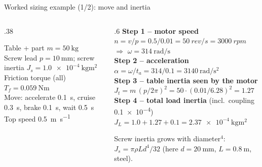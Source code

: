 \documentclass[aspectratio=169,10pt]{beamer}
\begin{document}
\begin{frame}{Worked sizing example (1/2): move and inertia}
\begin{columns}[T]
\begin{column}{.38\textwidth}
\begin{defbox}
\small
Table + part $m=\SI{50}{\kilo\gram}$\\
Screw lead $p=\SI{10}{\milli\metre}$; screw inertia $J_s=\SI{1.0e-4}{\kilo\gram\metre\squared}$\\
Friction torque (all) $T_f=\SI{0.059}{\newton\metre}$\\
Move: accelerate \SI{0.1}{\second}, cruise \SI{0.3}{\second}, brake \SI{0.1}{\second}, wait \SI{0.5}{\second}\\
Top speed \SI{0.5}{\metre\per\second}
\end{defbox}
\end{column}
\begin{column}{.6\textwidth}
\small
\textbf{Step 1 -- motor speed}\\
$n=v/p=0.5/0.01=\SI{50}{rev/s}=\SI{3000}{rpm}$ $\Rightarrow$ $\omega=\SI{314}{\radian\per\second}$\\[2mm]
\textbf{Step 2 -- acceleration}\\
$\alpha=\omega/t_a=314/0.1=\SI{3140}{\radian\per\second\squared}$\\[2mm]
\textbf{Step 3 -- table inertia seen by the motor}\\
$J_t=m\,(p/2\pi)^2=50\cdot(0.01/6.28)^2=\SI{1.27e-4}{\kilo\gram\metre\squared}$\\[2mm]
\textbf{Step 4 -- total load inertia} (incl.\ coupling \SI{0.1e-4}{})\\
$J_L=1.0+1.27+0.1=\SI{2.37e-4}{\kilo\gram\metre\squared}$
\begin{notebox}
Screw inertia grows with diameter$^4$: $J_s=\pi\rho L d^4/32$ (here $d=\SI{20}{\milli\metre}$, $L=\SI{0.8}{\metre}$, steel).
\end{notebox}
\end{column}
\end{columns}
\end{frame}
\end{document}
